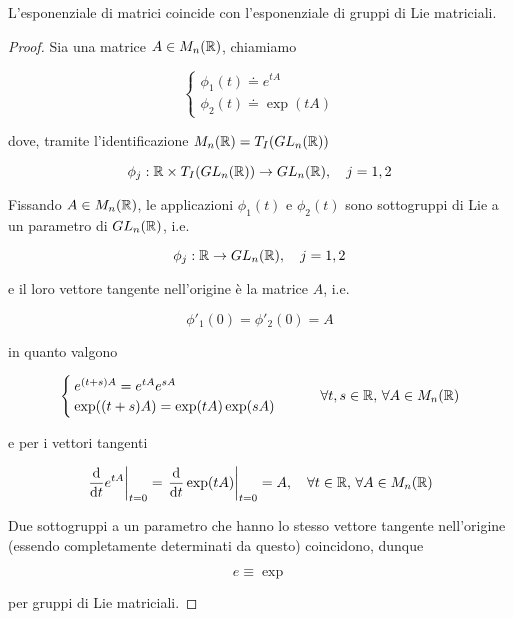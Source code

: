 \begin{corollary}
	L'esponenziale di matrici coincide con l'esponenziale di gruppi di Lie matriciali.
\end{corollary}

\begin{proof}
	Sia una matrice $ A \in M_{n}(\mathbb{R}) $, chiamiamo
	
	\begin{equation}
		\begin{cases}
			\phi_{1}(t) \doteq e^{t A} \\
			\phi_{2}(t) \doteq \exp(t A)
		\end{cases}
	\end{equation}

	dove, tramite l'identificazione $ M_{n}(\mathbb{R}) = T_{I}(GL_{n}(\mathbb{R})) $
	
	\begin{equation}
		\phi_{j} : \R \times T_{I}(GL_{n}(\R)) \to GL_{n}(\R) \qcomma j=1,2
	\end{equation}

	Fissando $ A \in M_{n}(\mathbb{R}) $, le applicazioni $ \phi_{1}(t) $ e $ \phi_{2}(t) $ sono sottogruppi di Lie a un parametro di $ GL_{n}(\mathbb{R}) $, i.e.
	
	\begin{equation}
		\phi_{j} : \R \to GL_{n}(\R) \qcomma j=1,2
	\end{equation}
	
	e il loro vettore tangente nell'origine è la matrice $ A $, i.e.
	
	\begin{equation}
		\phi'_{1}(0) = \phi'_{2}(0) = A
	\end{equation}

	in quanto valgono
	
	\begin{equation}
		\begin{cases}
			e^{(t+s) A} = e^{t A} e^{s A} \\
			\exp((t+s) A) = \exp(t A) \exp(s A)
		\end{cases} %
		\qquad \forall t,s \in \R, \, \forall A \in M_{n}(\R)
	\end{equation}

	e per i vettori tangenti
	
	\begin{equation}
		\eval{ \dv{t} e^{t A} }_{t=0} = \eval{ \dv{t} \exp(t A) }_{t=0} = A %
		\qcomma \forall t \in \R, \, \forall A \in M_{n}(\R)
	\end{equation}

	Due sottogruppi a un parametro che hanno lo stesso vettore tangente nell'origine (essendo completamente determinati da questo) coincidono, dunque
	
	\begin{equation}
		e \equiv \exp
	\end{equation}

	per gruppi di Lie matriciali.
\end{proof}

